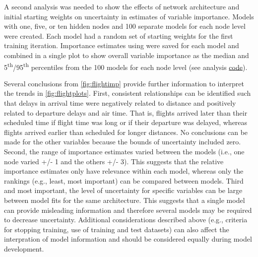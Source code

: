 \documentclass[article,shortnames]{jss}
\begin{document}
A second analysis was needed to show the effects of network architecture and initial starting weights on uncertainty in estimates of variable importance. Models with one, five, or ten hidden nodes and 100 separate models for each node level were created.  Each model had a random set of starting weights for the first training iteration.  Importance estimates using  were saved for each model and combined in a single plot to show overall variable importance as the median and 5\textsuperscript{th}/95\textsuperscript{th} percentiles from the 100 models for each node level (see analysis \href{https://raw.githubusercontent.com/fawda123/nnt_manu/master/flightimp.R}{code}).   

Several conclusions from \cref{fig:flightimp} provide further information to interpret the trends in \cref{fig:flightplots}.  First, consistent relationships can be identified such that delays in arrival time were negatively related to distance and positively related to departure delays and air time.  That is, flights arrived later than their scheduled time if flight time was long or if their departure was delayed, whereas flights arrived earlier than scheduled for longer distances.  No conclusions can be made for the other variables because the bounds of uncertainty included zero.  Second, the range of importance estimates varied between the models (i.e., one node  varied +/- 1 and the others +/- 3).  This suggests that the relative importance estimates only have relevance within each model, whereas only the rankings (e.g., least, most important) can be compared between models.  Third and most important, the level of uncertainty for specific variables can be large between model fits for the same architecture.  This suggests that a single model can provide misleading information and therefore several models may be required to decrease uncertainty.  Additional considerations described above (e.g., criteria for stopping training, use of training and test datasets) can also affect the interpration of model information and should be considered equally during model development.
\end{document}
